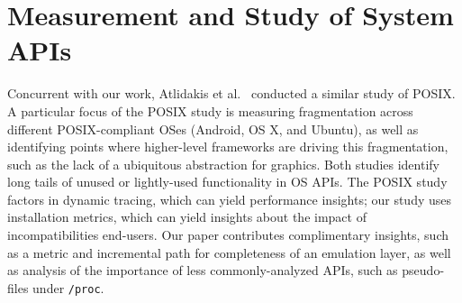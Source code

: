 \section{Measurement and Study of System APIs}


Concurrent with our work, Atlidakis et al.~\citep{atlidakis16posix} conducted a similar 
study of POSIX.
A particular focus of the POSIX study is measuring fragmentation across different POSIX-compliant OSes
(Android, OS X, and Ubuntu), as well as identifying points where higher-level frameworks
are driving this fragmentation, such as the lack of a ubiquitous abstraction for graphics.
Both studies identify long tails of unused or lightly-used functionality in OS APIs.
The POSIX study factors in dynamic tracing, which can yield performance insights;
our study uses installation metrics, which can yield insights about the impact of incompatibilities end-users.
Our paper contributes complimentary insights, such as a metric and incremental path for 
completeness of an emulation layer, as well as analysis of the importance of less commonly-analyzed 
APIs, such as pseudo-files under {\tt /proc}.


